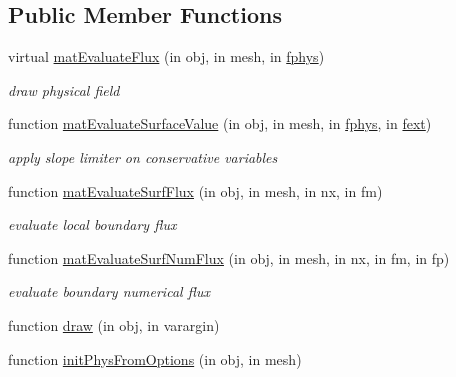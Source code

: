 \subsection*{Public Member Functions}
\begin{DoxyCompactItemize}
\item 
virtual \hyperlink{class_s_w_e_abstract1d_a19f49ee60a89a5d40ae7ee30bf74c1c0}{mat\+Evaluate\+Flux} (in obj, in mesh, in \hyperlink{class_ndg_phys_a6b25724fc9474d32018439009072f0a9}{fphys})
\begin{DoxyCompactList}\small\item\em draw physical field \end{DoxyCompactList}\item 
function \hyperlink{class_s_w_e_abstract1d_a159adc4fb33b3576a24daecd9a21d36e}{mat\+Evaluate\+Surface\+Value} (in obj, in mesh, in \hyperlink{class_ndg_phys_a6b25724fc9474d32018439009072f0a9}{fphys}, in \hyperlink{class_ndg_phys_mat_a2b0e8a77bf5f6fe870b12e400d6d83f3}{fext})
\begin{DoxyCompactList}\small\item\em apply slope limiter on conservative variables \end{DoxyCompactList}\item 
function \hyperlink{class_s_w_e_abstract1d_aeaf500879b2c268318c615244eb1d08e}{mat\+Evaluate\+Surf\+Flux} (in obj, in mesh, in nx, in fm)
\begin{DoxyCompactList}\small\item\em evaluate local boundary flux \end{DoxyCompactList}\item 
function \hyperlink{class_s_w_e_abstract1d_a8268ae38a18c22d7ce24f2ca873d7331}{mat\+Evaluate\+Surf\+Num\+Flux} (in obj, in mesh, in nx, in fm, in fp)
\begin{DoxyCompactList}\small\item\em evaluate boundary numerical flux \end{DoxyCompactList}\item 
function \hyperlink{class_s_w_e_abstract1d_a2b8c74b8abac2cb41f60376b23c01951}{draw} (in obj, in varargin)
\item 
function \hyperlink{class_s_w_e_abstract1d_a3a2d97b2ec4a086c723595b8c3c551c5}{init\+Phys\+From\+Options} (in obj, in mesh)
\end{DoxyCompactItemize}
